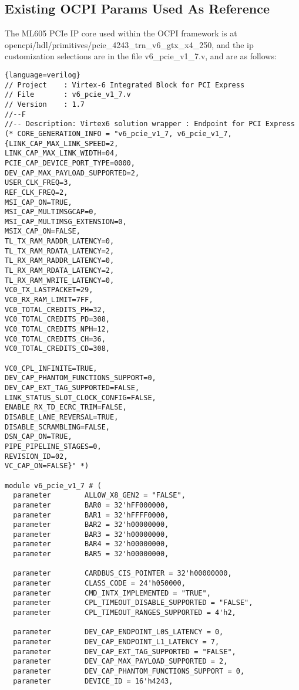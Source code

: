 \subsection{Existing OCPI Params Used As Reference}
The ML605 PCIe IP core used within the OCPI framework is at opencpi/hdl/primitives/pcie\_4243\_trn\_v6\_gtx\_x4\_250, and the ip customization selections are in the file v6\_pcie\_v1\_7.v, and are as follows:
\begin{lstlisting}{language=verilog}
// Project    : Virtex-6 Integrated Block for PCI Express
// File       : v6_pcie_v1_7.v
// Version    : 1.7
//--F
//-- Description: Virtex6 solution wrapper : Endpoint for PCI Express
(* CORE_GENERATION_INFO = "v6_pcie_v1_7, v6_pcie_v1_7, {LINK_CAP_MAX_LINK_SPEED=2, 
LINK_CAP_MAX_LINK_WIDTH=04, 
PCIE_CAP_DEVICE_PORT_TYPE=0000, 
DEV_CAP_MAX_PAYLOAD_SUPPORTED=2, 
USER_CLK_FREQ=3, 
REF_CLK_FREQ=2, 
MSI_CAP_ON=TRUE, 
MSI_CAP_MULTIMSGCAP=0, 
MSI_CAP_MULTIMSG_EXTENSION=0, 
MSIX_CAP_ON=FALSE, 
TL_TX_RAM_RADDR_LATENCY=0, 
TL_TX_RAM_RDATA_LATENCY=2, 
TL_RX_RAM_RADDR_LATENCY=0, 
TL_RX_RAM_RDATA_LATENCY=2, 
TL_RX_RAM_WRITE_LATENCY=0, 
VC0_TX_LASTPACKET=29, 
VC0_RX_RAM_LIMIT=7FF, 
VC0_TOTAL_CREDITS_PH=32, 
VC0_TOTAL_CREDITS_PD=308, 
VC0_TOTAL_CREDITS_NPH=12, 
VC0_TOTAL_CREDITS_CH=36, 
VC0_TOTAL_CREDITS_CD=308, 

VC0_CPL_INFINITE=TRUE, 
DEV_CAP_PHANTOM_FUNCTIONS_SUPPORT=0, 
DEV_CAP_EXT_TAG_SUPPORTED=FALSE, 
LINK_STATUS_SLOT_CLOCK_CONFIG=FALSE, 
ENABLE_RX_TD_ECRC_TRIM=FALSE, 
DISABLE_LANE_REVERSAL=TRUE, 
DISABLE_SCRAMBLING=FALSE, 
DSN_CAP_ON=TRUE, 
PIPE_PIPELINE_STAGES=0, 
REVISION_ID=02, 
VC_CAP_ON=FALSE}" *)  

module v6_pcie_v1_7 # (  
  parameter        ALLOW_X8_GEN2 = "FALSE", 
  parameter        BAR0 = 32'hFF000000, 
  parameter        BAR1 = 32'hFFFF0000, 
  parameter        BAR2 = 32'h00000000, 
  parameter        BAR3 = 32'h00000000, 
  parameter        BAR4 = 32'h00000000, 
  parameter        BAR5 = 32'h00000000, 

  parameter        CARDBUS_CIS_POINTER = 32'h00000000, 
  parameter        CLASS_CODE = 24'h050000, 
  parameter        CMD_INTX_IMPLEMENTED = "TRUE", 
  parameter        CPL_TIMEOUT_DISABLE_SUPPORTED = "FALSE", 
  parameter        CPL_TIMEOUT_RANGES_SUPPORTED = 4'h2, 

  parameter        DEV_CAP_ENDPOINT_L0S_LATENCY = 0, 
  parameter        DEV_CAP_ENDPOINT_L1_LATENCY = 7, 
  parameter        DEV_CAP_EXT_TAG_SUPPORTED = "FALSE", 
  parameter        DEV_CAP_MAX_PAYLOAD_SUPPORTED = 2, 
  parameter        DEV_CAP_PHANTOM_FUNCTIONS_SUPPORT = 0, 
  parameter        DEVICE_ID = 16'h4243, 


\end{lstlisting}
